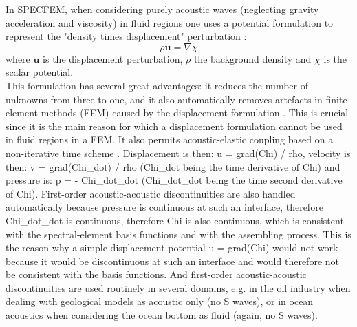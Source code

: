 In SPECFEM, when considering purely acoustic waves (neglecting gravity acceleration and viscosity)
in fluid regions one uses a potential formulation to represent the "density times displacement" perturbation
\citep{ChKoViCaVaFe07}:
\begin{equation}
\rho \mathbf{u} = \nabla \chi
\label{potential}
\end{equation}
where $\mathbf{u}$ is the displacement perturbation, $\rho$ the background density and $\chi$ is the scalar potential.\\
This formulation has several great advantages: it reduces the number of unknowns from three to one, and it also automatically removes artefacts
in finite-element methods (FEM) caused by the displacement formulation \citep{HaOuVe78}.
This is crucial since it is the main reason for which a displacement formulation cannot be used in fluid regions in a FEM.
It also permits acoustic-elastic coupling based on a non-iterative time scheme \citep{ChVa04}.
Displacement is then: u = grad(Chi) / rho,
velocity is then: v = grad(Chi\_dot) / rho (Chi\_dot being the time derivative of Chi)
and pressure is: p = - Chi\_dot\_dot  (Chi\_dot\_dot being the time second derivative of Chi).
First-order acoustic-acoustic discontinuities are also handled automatically
because pressure is continuous at such an interface, therefore Chi\_dot\_dot
is continuous, therefore Chi is also continuous, which is consistent with
the spectral-element basis functions and with the assembling process.
This is the reason why a simple displacement potential u = grad(Chi) would
not work because it would be discontinuous at such an interface and would
therefore not be consistent with the basis functions. And first-order acoustic-acoustic discontinuities are used
routinely in several domains, e.g. in the oil industry when dealing with geological models as acoustic only (no S waves),
or in ocean acoustics when considering the ocean bottom as fluid (again, no S waves).
\newline


